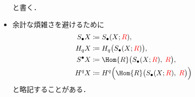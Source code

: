 \documentclass[algtopo_main]{subfiles}
\begin{document}
\begin{itemize}
    と書く．
    \item 余計な煩雑さを避けるために
    \begin{align}
        S_\bullet X &\coloneqq S_\bullet (X; \textcolor{red}{R}), \label{not:SCC} \\
        H_q X &\coloneqq H_q\bigl(S_\bullet (X; \textcolor{red}{R})\bigr), \label{not:SH} \\
        S^\bullet X &\coloneqq \Hom{R} \bigl( S_\bullet(X; \textcolor{red}{R}),\; \textcolor{red}{R} \bigr), \label{not:ScCC} \\
        H^q X &\coloneqq H^q\Bigl(\Hom{R} \bigl( S_\bullet(X; \textcolor{red}{R}),\; \textcolor{red}{R} \bigr)\Bigr) \label{not:ScH}
    \end{align}
    と略記することがある．
\end{itemize}
\end{document}
